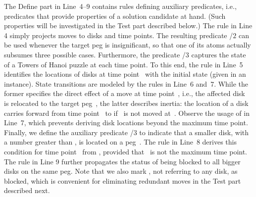 The Define part in Line~4--9 contains
rules defining auxiliary predicates, i.e.,
predicates that provide properties of a solution candidate at hand.
(Such properties will be investigated in the Test part described below.)
The rule in Line 4 simply projects moves to disks and time points.
The resulting predicate /$2$ can be used whenever the target peg
is insignificant, so that one of its atoms actually subsumes three possible cases.
Furthermore,
the predicate /$3$ captures the state of a Towers of Hanoi puzzle at each time point.
To this end,
the rule in Line~5 
identifies 
the locations of disks at time point~
with the initial state (given in an instance).
State transitions are modeled by the rules in Line~6 and~7.
While the former specifies the direct effect of a move at time point~, i.e.,
the affected disk~ is relocated to the target peg~,
the latter describes inertia:
the location of a disk~
carries forward from time point~ to 
if~ is not moved at~.
Observe the usage of  in Line~7,
which prevents deriving disk locations beyond the maximum time point. %
Finally, we define the auxiliary predicate /$3$ to
indicate that a smaller disk, with a number greater than , is
located on a peg~.
The rule in Line~8 derives this condition for time point~
from , %
provided that~ is not the maximum time point.
The rule in Line 9 further propagates the status of being blocked
to all bigger disks on the same peg.
Note that we also mark , not referring to any disk, as blocked,
which is convenient for eliminating redundant moves
in the Test part described next.

